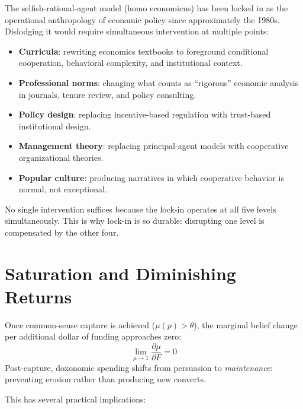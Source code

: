 \begin{example}
\label{ex:lock-in-homo-economicus}
The selfish-rational-agent model (homo economicus) has been locked in as the operational anthropology of economic policy since approximately the 1980s.
Dislodging it would require simultaneous intervention at multiple points:
\begin{itemize}[nosep]
  \item \textbf{Curricula}: rewriting economics textbooks to foreground conditional cooperation, behavioral complexity, and institutional context.
  \item \textbf{Professional norms}: changing what counts as ``rigorous'' economic analysis in journals, tenure review, and policy consulting.
  \item \textbf{Policy design}: replacing incentive-based regulation with trust-based institutional design.
  \item \textbf{Management theory}: replacing principal-agent models with cooperative organizational theories.
  \item \textbf{Popular culture}: producing narratives in which cooperative behavior is normal, not exceptional.
\end{itemize}
No single intervention suffices because the lock-in operates at all five levels simultaneously.
This is why lock-in is so durable: disrupting one level is compensated by the other four.
\end{example}


\section{Saturation and Diminishing Returns}
\label{sec:ch8-saturation-returns}

\begin{proposition}
\label{prop:diminishing}
Once common-sense capture is achieved ($\mu(p) > \theta$), the marginal belief change per additional dollar of funding approaches zero:
\[
  \lim_{\mu \to 1} \frac{\partial \mu}{\partial F} = 0
\]
Post-capture, doxonomic spending shifts from persuasion to \emph{maintenance}: preventing erosion rather than producing new converts.
\end{proposition}

This has several practical implications:

